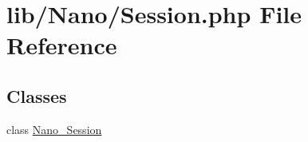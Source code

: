 \hypertarget{Session_8php}{
\section{lib/Nano/Session.php File Reference}
\label{Session_8php}
}
\subsection*{Classes}
\begin{CompactItemize}
\item 
class \hyperlink{classNano__Session}{Nano\_\-Session}
\end{CompactItemize}
